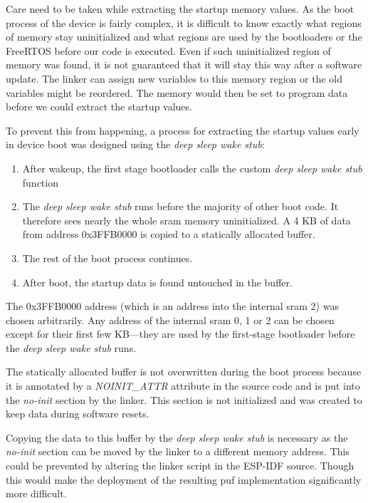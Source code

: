 Care need to be taken while extracting the startup memory values. As the boot process of the device is fairly complex, it is difficult to know exactly what regions of memory stay uninitialized and what regions are used by the bootloaders or the FreeRTOS before our code is executed. Even if such uninitialized region of memory was found, it is not guaranteed that it will stay this way after a software update. The linker can assign new variables to this memory region or the old variables might be reordered. The memory would then be set to program data before we could extract the startup values.

To prevent this from happening, a process for extracting the startup values early in device boot was designed using the \emph{deep sleep wake stub}:

\begin{enumerate}
    \item After wakeup, the first stage bootloader calls the custom \emph{deep sleep wake stub} function
    \item The \emph{deep sleep wake stub} runs before the majority of other boot code. It therefore sees nearly the whole \gls{sram} memory uninitialized. A 4 KB of data from address 0x3FFB0000 is copied to a statically allocated buffer.
    \item The rest of the boot process continues.
    \item After boot, the startup data is found untouched in the buffer.
\end{enumerate}

The 0x3FFB0000 address (which is an address into the internal \gls{sram} 2) was chosen arbitrarily. Any address of the internal \gls{sram} 0, 1 or 2 can be chosen except for their first few KB---they are used by the first-stage bootloader before the \emph{deep sleep wake stub} runs.

The statically allocated buffer is not overwritten during the boot process because it is annotated by a \emph{NOINIT\_ATTR} attribute in the source code and is put into the \emph{no-init} section by the linker. This section is not initialized and was created to keep data during software resets.\cite{espidf2022}

Copying the data to this buffer by the \emph{deep sleep wake stub} is necessary as the \emph{no-init} section can be moved by the linker to a different memory address. This could be prevented by altering the linker script in the ESP-IDF source. Though this would make the deployment of the resulting \gls{puf} implementation significantly more difficult.


